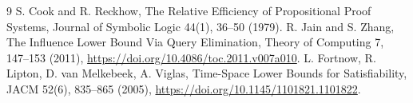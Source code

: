 \documentclass[11pt]{article}
\begin{document}
\begin{thebibliography}{9}
 S. Cook and R. Reckhow, The Relative Efficiency of Propositional Proof Systems, Journal of Symbolic Logic 44(1), 36--50 (1979).
 R. Jain and S. Zhang, The Influence Lower Bound Via Query Elimination, Theory of Computing 7, 147--153 (2011), \url{https://doi.org/10.4086/toc.2011.v007a010}.
 L. Fortnow, R. Lipton, D. van Melkebeek, A. Viglas, Time-Space Lower Bounds for Satisfiability, JACM 52(6), 835--865 (2005), \url{https://doi.org/10.1145/1101821.1101822}.
\end{thebibliography}
\end{document}
